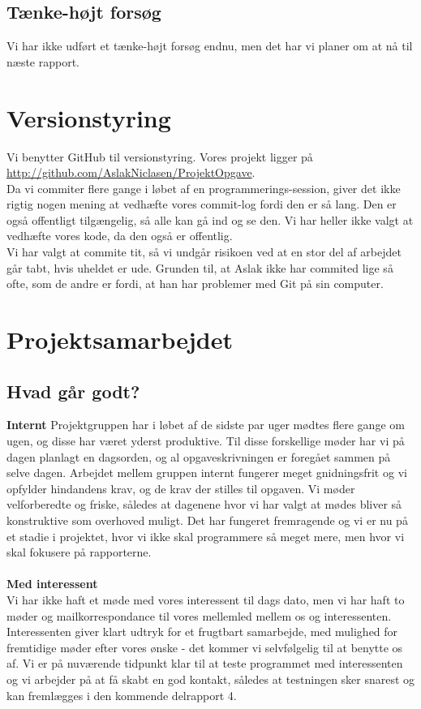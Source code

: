 \documentclass[a4paper,12pt]{article}
\begin{document}
\subsection*{Tænke-højt forsøg}
Vi har ikke udført et tænke-højt forsøg endnu, men det har vi planer om at nå til næste rapport.


\section{Versionstyring}
Vi benytter GitHub til versionstyring. Vores projekt ligger på
\newline
\url{http://github.com/AslakNiclasen/ProjektOpgave}.
\newline
\\
Da vi commiter flere gange i løbet af en programmerings-session, giver det ikke rigtig nogen mening at vedhæfte vores commit-log fordi den er så lang. Den er også offentligt tilgængelig, så alle kan gå ind og se den. Vi har heller ikke valgt at vedhæfte vores kode, da den også er offentlig.
\newline
\\
Vi har valgt at commite tit, så vi undgår risikoen ved at en stor del af arbejdet går tabt, hvis uheldet er ude. Grunden til, at Aslak ikke har commited lige så ofte, som de andre er fordi, at han har problemer med Git på sin computer.

\section{Projektsamarbejdet}
\subsection{Hvad går godt?}
\textbf{Internt}
\newline
Projektgruppen har i løbet af de sidste par uger mødtes flere gange om ugen, og disse har været yderst produktive. Til disse forskellige møder har vi på dagen planlagt en dagsorden, og al opgaveskrivningen er foregået sammen på selve dagen. Arbejdet mellem gruppen internt fungerer meget gnidningsfrit og vi opfylder hindandens krav, og de krav der stilles til opgaven. Vi møder velforberedte og friske, således at dagenene hvor vi har valgt at mødes bliver så konstruktive som overhoved muligt. Det har fungeret fremragende og vi er nu på et stadie i projektet, hvor vi ikke skal programmere så meget mere, men hvor vi skal fokusere på rapporterne.
\\
\\
\textbf{Med interessent}
\\
Vi har ikke haft et møde med vores interessent til dags dato, men vi har haft to møder og mailkorrespondance til vores mellemled mellem os og interessenten. Interessenten giver klart udtryk for et frugtbart samarbejde, med mulighed for fremtidige møder efter vores ønske - det kommer vi selvfølgelig til at benytte os af. Vi er på nuværende tidpunkt klar til at teste programmet med interessenten og vi arbejder på at få skabt en god kontakt, således at testningen sker snarest og kan fremlægges i den kommende delrapport 4.
\\
\\
\end{document}
